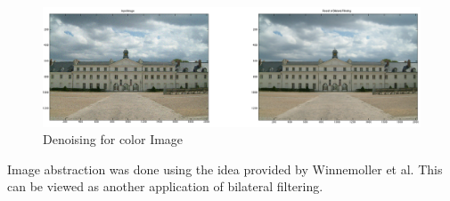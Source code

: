 \documentclass[12pt]{article}
\begin{document}
\begin{figure}[ht!]
        \centering
                \includegraphics[width=\textwidth]{color1}
                \caption{Denoising for color Image}
\end{figure}

Image abstraction was done using the idea provided by Winnemoller et al. This can be viewed as another application of bilateral filtering.
\end{document}
